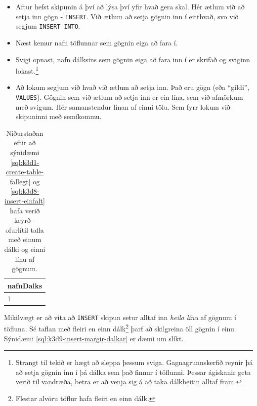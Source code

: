 \begin{itemize}
 \item Aftur hefst skipunin á því að lýsa því yfir hvað gera skal. Hér ætlum við að setja inn gögn - \verb|INSERT|. Við ætlum að setja gögnin inn í eitthvað, svo við segjum \verb|INSERT INTO|.
 \item Næst kemur nafn töflunnar sem gögnin eiga að fara í. %
 \item Svigi opnast, nafn dálksins sem gögnin eiga að fara inn í er skrifað og sviginn lokast.\footnote{Strangt til tekið er hægt að sleppa þessum sviga. Gagnagrunnskerfið reynir þá að setja gögnin inn í þá dálka sem það finnur í töflunni. Þessar ágiskanir geta verið til vandræða, betra er að venja sig á að taka dálkheitin alltaf fram.}
 \item Að lokum segjum við hvað við ætlum að setja inn. Það eru gögn (eða ``gildi'', \verb|VALUES|). Gögnin sem við ætlum að setja inn er ein lína, sem við afmörkum með svigum. Hér samanstendur línan af einni tölu. Sem fyrr lokum við skipuninni með semíkommu.
\end{itemize}

\begin{table}
\centering
\caption[Eftir einfalt INSERT]{Niðurstaðan eftir að sýnidæmi \ref{sql:k3d1-create-table-fallegt} og \ref{sql:k3d8-insert-einfalt} hafa verið keyrð - ofurlítil tafla með einum dálki og einni línu af gögnum.}
\label{tafla:insert-einfalt}
\begin{tabular}{l}
\toprule
nafnDalks\\
\midrule
1\\
\bottomrule
\end{tabular}
\end{table}

Mikilvægt er að vita að \verb|INSERT| skipun setur alltaf inn \emph{heila línu} af gögnum í töfluna. Sé taflan með fleiri en einn dálk\footnote{Flestar alvöru töflur hafa fleiri en einn dálk.} þarf að skilgreina öll gögnin í einu. Sýnidæmi \ref{sql:k3d9-insert-margir-dalkar} er dæmi um slíkt.

\begin{example}
\caption[INSERT í tvo dálka í einu]{INSERT í tvo dálka í einu. Þessi skipun setur tölurnar $1$ og $2$ inn í sömu línu. Niðurstaðan er tafla \ref{tafla:insert-margir-dalkar}.}
\label{sql:k3d9-insert-margir-dalkar}
\centering
{}
\end{example}

